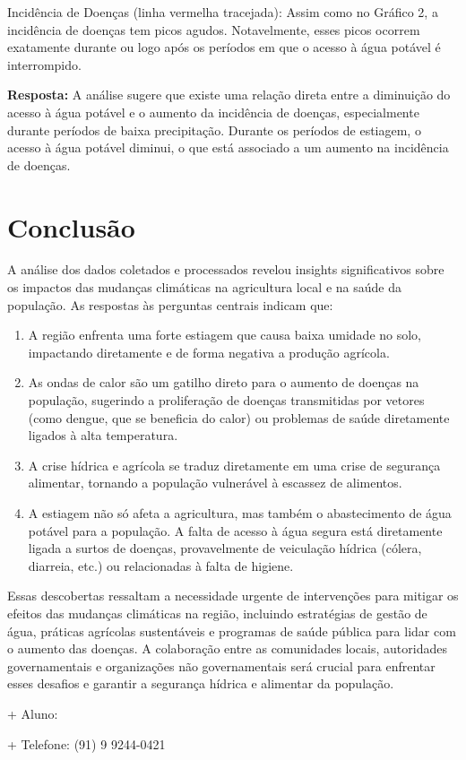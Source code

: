 \documentclass[12pt, a4paper, onecolumn]{article}
\begin{document}
    Incidência de Doenças (linha vermelha tracejada): Assim como no Gráfico 2, a incidência de doenças tem picos agudos. Notavelmente, esses picos ocorrem exatamente durante ou logo após os períodos em que o acesso à água potável é interrompido.
    \vspace{0.5cm}

    \textbf{Resposta:} A análise sugere que existe uma relação direta entre a diminuição do acesso à água potável e o aumento da incidência de doenças, especialmente durante períodos de baixa precipitação. Durante os períodos de estiagem, o acesso à água potável diminui, o que está associado a um aumento na incidência de doenças.

    \section{Conclusão}
    A análise dos dados coletados e processados revelou insights significativos sobre os impactos das mudanças climáticas na agricultura local e na saúde da população. As respostas às perguntas centrais indicam que:
    \begin{enumerate}
        \item A região enfrenta uma forte estiagem que causa baixa umidade no solo, impactando diretamente e de forma negativa a produção agrícola.
        \item  As ondas de calor são um gatilho direto para o aumento de doenças na população, sugerindo a proliferação de doenças transmitidas por vetores (como dengue, que se beneficia do calor) ou problemas de saúde diretamente ligados à alta temperatura.
        \item A crise hídrica e agrícola se traduz diretamente em uma crise de segurança alimentar, tornando a população vulnerável à escassez de alimentos.
        \item A estiagem não só afeta a agricultura, mas também o abastecimento de água potável para a população. A falta de acesso à água segura está diretamente ligada a surtos de doenças, provavelmente de veiculação hídrica (cólera, diarreia, etc.) ou relacionadas à falta de higiene.
    \end{enumerate}

    Essas descobertas ressaltam a necessidade urgente de intervenções para mitigar os efeitos das mudanças climáticas na região, incluindo estratégias de gestão de água, práticas agrícolas sustentáveis e programas de saúde pública para lidar com o aumento das doenças. A colaboração entre as comunidades locais, autoridades governamentais e organizações não governamentais será crucial para enfrentar esses desafios e garantir a segurança hídrica e alimentar da população.

    \vspace{1cm}
    + Aluno: \author{Felipe Rafael Barbosa}

    + Telefone: (91) 9 9244-0421
\end{document}
